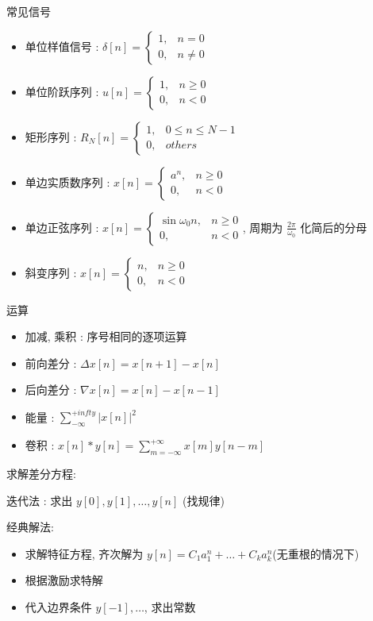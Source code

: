 \documentclass[UTF8, 12pt]{ctexart}
\begin{document}
	常见信号
	\begin{itemize}[leftmargin = 4em]
		\item 单位样值信号 : $ \delta[n] = \begin{cases} 1,& n = 0 \\ 0,& n \neq 0 \end{cases} $
		\item 单位阶跃序列 : $ u[n] = \begin{cases} 1,& n \geq 0 \\ 0,& n < 0 \end{cases} $
		\item 矩形序列 : $ R_{N}[n] = \begin{cases} 1,& 0 \leq n \leq N-1 \\ 0,& others \end{cases} $
		\item 单边实质数序列 : $ x[n] = \begin{cases} a^{n},& n \geq 0 \\ 0,& n < 0 \end{cases} $
		\item 单边正弦序列 : $ x[n] = \begin{cases} \sin\omega_{0}n,& n \geq 0 \\ 0,& n < 0 \end{cases} $, 周期为 $ \frac{2\pi}{\omega_{0}} $ 化简后的分母
		\item 斜变序列 : $ x[n] = \begin{cases} n,& n \geq 0 \\ 0,& n < 0 \end{cases} $
	\end{itemize}

	运算
	\begin{itemize}[leftmargin = 4em]
		\item 加减, 乘积 : 序号相同的逐项运算
		\item 前向差分 : $ \Delta x[n] = x[n+1] - x[n] $
		\item 后向差分 : $ \nabla x[n] = x[n] - x[n-1] $
		\item 能量 : $ \sum\limits_{-\infty}^{+infty}|x[n]|^{2} $
		\item 卷积 : $ x[n] * y[n] = \sum\limits_{m = -\infty}^{+\infty}x[m]y[n-m] $
	\end{itemize}

	求解差分方程:

	迭代法 : 求出 $ y[0], y[1], \dots, y[n] $ (找规律)

	经典解法:
	\begin{itemize}[leftmargin = 4em]
		\item 求解特征方程, 齐次解为 $ y[n] = C_{1}a_{1}^{n} + \dots + C_{k}a_{k}^{n} $(无重根的情况下)
		\item 根据激励求特解
		\item 代入边界条件 $ y[-1], \dots $, 求出常数
	\end{itemize}
\end{document}
